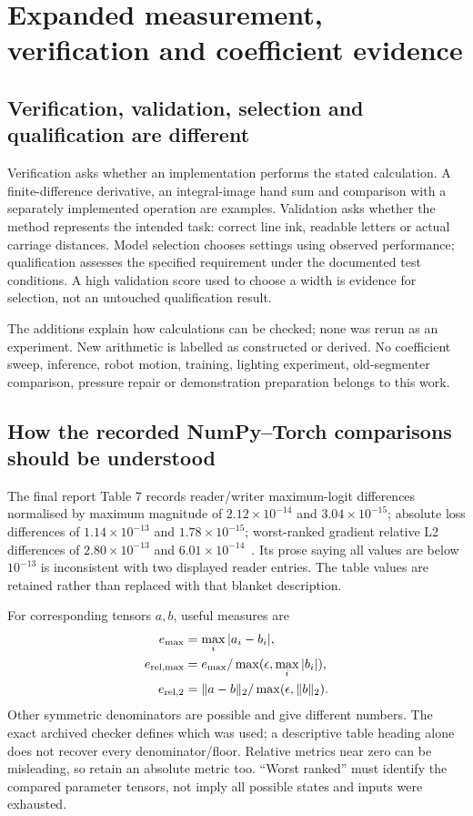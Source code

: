 \chapter{Expanded measurement, verification and coefficient evidence}
\label{ch:expand-verification}
\section{Verification, validation, selection and qualification are different}
Verification asks whether an implementation performs the stated calculation.
A finite-difference derivative, an integral-image hand sum and comparison with
a separately implemented operation are examples. Validation asks whether the
method represents the intended task: correct line ink, readable letters or
actual carriage distances. Model selection chooses settings using observed
performance; qualification assesses the specified requirement under the
documented test conditions. A high validation score used to choose a width
is evidence for selection, not an untouched qualification result.

The additions explain how calculations can be checked; none was rerun as an
experiment. New arithmetic is labelled as constructed or derived. No coefficient
sweep, inference, robot motion, training, lighting experiment, old-segmenter
comparison, pressure repair or demonstration preparation belongs to this work.

\section{How the recorded NumPy--Torch comparisons should be understood}
The final report Table 7 records reader/writer maximum-logit differences
normalised by maximum magnitude of $2.12\times10^{-14}$ and
$3.04\times10^{-15}$; absolute loss differences of $1.14\times10^{-13}$
and $1.78\times10^{-15}$; worst-ranked gradient relative L2 differences of
$2.80\times10^{-13}$ and $6.01\times10^{-14}$~\cite{finalreport2026}.
Its prose saying all values are below $10^{-13}$ is inconsistent with two
displayed reader entries. The table values are retained rather than replaced
with that blanket description.

For corresponding tensors $a,b$, useful measures are
\begin{align*}
e_{\max}&=\max_i|a_i-b_i|,\\
e_{\rm rel,max}&=e_{\max}/\max(\epsilon,\max_i|b_i|),\\
e_{\rm rel,2}&=\|a-b\|_2/\max(\epsilon,\|b\|_2).
\end{align*}
Other symmetric denominators are possible and give different numbers.
The exact archived checker defines which was used; a descriptive table
heading alone does not recover every denominator/floor. Relative metrics
near zero can be misleading, so retain an absolute metric too. ``Worst ranked''
must identify the compared parameter tensors, not imply all possible states
and inputs were exhausted.

